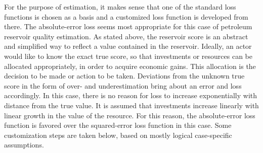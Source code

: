 	For the purpose of estimation, it makes sense that one of the standard loss functions is chosen as a basis and a customized loss function is developed from there. The absolute-error loss seems most appropriate for this case of petroleum reservoir quality estimation. As stated above, the reservoir score is an abstract and simplified way to reflect a value contained in the reservoir. Ideally, an actor would like to know the exact true score, so that investments or resources can be allocated appropriately, in order to acquire economic gains. This allocation is the decision to be made or action to be taken. Deviations from the unknown true score in the form of over- and underestimation bring about an error and loss accordingly. In this case, there is no reason for loss to increase exponentially with distance from the true value. It is assumed that investments increase linearly with linear growth in the value of the resource. For this reason, the absolute-error loss function is favored over the squared-error loss function in this case. Some customization steps are taken below, based on mostly logical case-specific assumptions.
	

